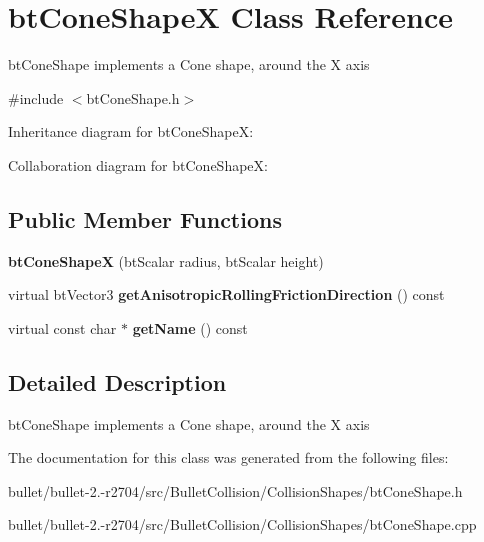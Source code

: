 \hypertarget{classbt_cone_shape_x}{\section{bt\+Cone\+Shape\+X Class Reference}
\label{classbt_cone_shape_x}
}


bt\+Cone\+Shape implements a Cone shape, around the X axis  




{\ttfamily \#include $<$bt\+Cone\+Shape.\+h$>$}



Inheritance diagram for bt\+Cone\+Shape\+X\+:


Collaboration diagram for bt\+Cone\+Shape\+X\+:
\subsection*{Public Member Functions}
\begin{DoxyCompactItemize}
\item 
\hypertarget{classbt_cone_shape_x_a2c800200020a99d63914876c8343ca03}{{\bfseries bt\+Cone\+Shape\+X} (bt\+Scalar radius, bt\+Scalar height)}\label{classbt_cone_shape_x_a2c800200020a99d63914876c8343ca03}

\item 
\hypertarget{classbt_cone_shape_x_a62171339a8bfb07957e61c9378e2ddb7}{virtual bt\+Vector3 {\bfseries get\+Anisotropic\+Rolling\+Friction\+Direction} () const }\label{classbt_cone_shape_x_a62171339a8bfb07957e61c9378e2ddb7}

\item 
\hypertarget{classbt_cone_shape_x_ab01fe5bb1ea1eb5ff3c573e02fe635a1}{virtual const char $\ast$ {\bfseries get\+Name} () const }\label{classbt_cone_shape_x_ab01fe5bb1ea1eb5ff3c573e02fe635a1}

\end{DoxyCompactItemize}


\subsection{Detailed Description}
bt\+Cone\+Shape implements a Cone shape, around the X axis 

The documentation for this class was generated from the following files\+:\begin{DoxyCompactItemize}
\item 
bullet/bullet-\/2.-\/r2704/src/\+Bullet\+Collision/\+Collision\+Shapes/bt\+Cone\+Shape.\+h\item 
bullet/bullet-\/2.-\/r2704/src/\+Bullet\+Collision/\+Collision\+Shapes/bt\+Cone\+Shape.\+cpp\end{DoxyCompactItemize}
